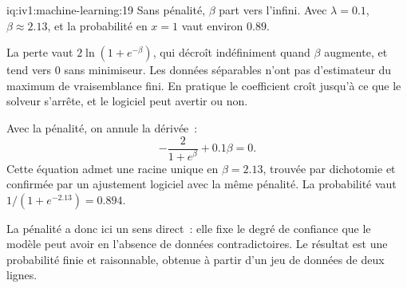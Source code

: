 \begin{solution}{iq:iv1:machine-learning:19}
Sans pénalité, $\beta$ part vers l'infini. Avec $\lambda = 0.1$, $\beta \approx 2.13$, et la probabilité en $x = 1$ vaut environ $0.89$.

La perte vaut $2\ln(1 + e^{-\beta})$, qui décroît indéfiniment quand $\beta$ augmente, et tend vers 0 sans minimiseur. Les données séparables n'ont pas d'estimateur du maximum de vraisemblance fini. En pratique le coefficient croît jusqu'à ce que le solveur s'arrête, et le logiciel peut avertir ou non.

Avec la pénalité, on annule la dérivée~:
\[
-\frac{2}{1 + e^{\beta}} + 0.1\beta = 0.
\]
Cette équation admet une racine unique en $\beta = 2.13$, trouvée par dichotomie et confirmée par un ajustement logiciel avec la même pénalité. La probabilité vaut $1/(1 + e^{-2.13}) = 0.894$.

La pénalité a donc ici un sens direct~: elle fixe le degré de confiance que le modèle peut avoir en l'absence de données contradictoires. Le résultat est une probabilité finie et raisonnable, obtenue à partir d'un jeu de données de deux lignes.



\end{solution}

